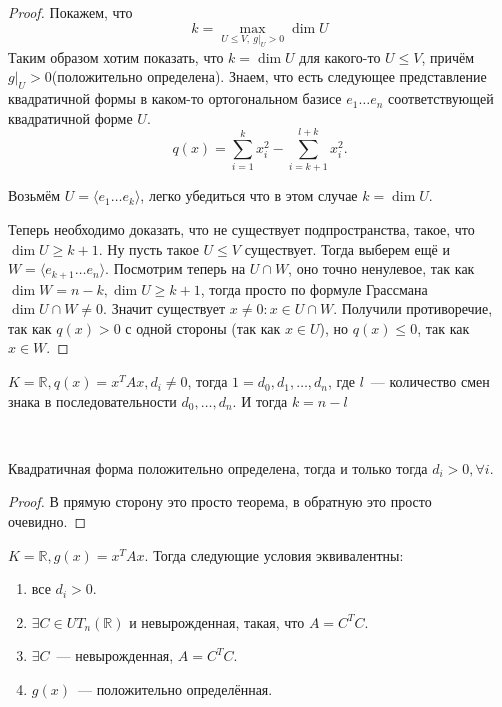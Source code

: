\begin{proof}
    Покажем, что 
    \[
            k = \max_{U\le V, \ g|_U > 0} \dim U
    \] Таким образом хотим показать, что $k = \dim U$ для какого-то  $U\le V$, причём $g|_U > 0$(положительно определена).
    Знаем, что есть следующее представление квадратичной формы в каком-то ортогональном базисе $e_1\dots e_n$ 
    соответствующей квадратичной форме $U$.
     \[
         q(x) = \sum\limits_{i=1}^{k}{x_i^2} - \sum\limits_{i = k + 1}^{l + k}{x^2_i}
    .\] 

    Возьмём $U = \langle e_1\dots e_k\rangle$, легко убедиться что в этом случае $k = \dim U$.

    Теперь необходимо доказать, что не существует подпространства, такое, что $\dim U \ge k + 1$. 
    Ну пусть такое $U \le V$ существует. Тогда выберем ещё и $W = \langle e_{k + 1} \dots e_n\rangle$.
    Посмотрим теперь на  $U \cap W$, оно точно ненулевое, так как $\dim W = n - k, \dim U \ge k + 1$,
    тогда просто по формуле Грассмана $\dim U \cap W \not= 0$.%
    Значит существует  $x \not= 0\colon x\in U\cap W$. Получили противоречие, так как $q(x) > 0$ с одной стороны
    (так как $x\in U$), но $q(x) \le 0$, так как $x\in W$.
\end{proof}
\begin{follow}
    $K = \mathbb{R}, q(x) = x^T A x, d_i \not= 0$, тогда  $1 = d_0,d_1,\dots, d_n$, где $l$~--- количество смен знака в
    последовательности $d_0,\dots,d_n$. И тогда $k = n - l$
\end{follow}
\\\quad
\begin{follow}
    Квадратичная форма положительно определена, тогда и только тогда $d_i > 0, \forall i$.
\end{follow}
\begin{proof}
    В прямую сторону это просто теорема, в обратную это просто очевидно.
\end{proof}
 \begin{theorem}
     $K = \mathbb{R}, g(x) = x^TAx.$ 
     Тогда следующие условия эквивалентны:
     \begin{enumerate}
         \item все $d_i > 0$.
         \item $\exists C \in UT_n(\mathbb{R})$ и невырожденная, такая, что $A = C^T C$.
         \item  $\exists C$~--- невырожденная, $A = C^T C$.
         \item  $g(x)$~--- положительно определённая.
     \end{enumerate}
\end{theorem}

